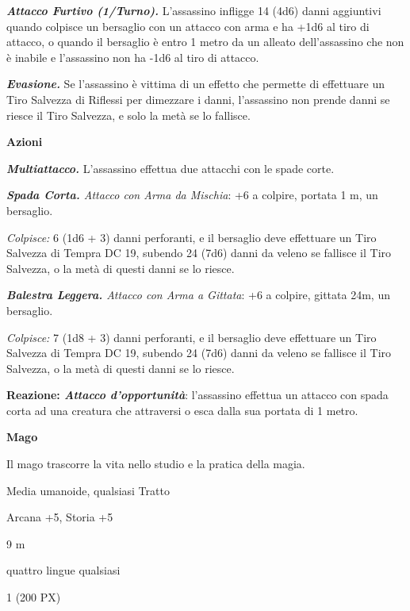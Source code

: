 \begin{multicols}{2}
{\emph{\textbf{Attacco Furtivo (1/Turno).}} L'assassino infligge 14 (4d6) danni aggiuntivi quando colpisce un bersaglio con un attacco con arma e ha +1d6 al tiro di attacco, o quando il bersaglio è entro 1 metro da un alleato dell'assassino che non è inabile e l'assassino non ha -1d6 al tiro di attacco.

\emph{\textbf{Evasione.}} Se l'assassino è vittima di un effetto che permette di effettuare un Tiro Salvezza di Riflessi per dimezzare i danni, l'assassino non prende danni se riesce il Tiro Salvezza, e solo la metà se lo fallisce.

\textbf{Azioni}

\emph{\textbf{Multiattacco.}} L'assassino effettua due attacchi con le spade corte.

\emph{\textbf{Spada Corta.} Attacco con Arma da Mischia}: +6 a colpire, portata 1 m, un bersaglio.

\emph{Colpisce:} 6 (1d6 + 3) danni perforanti, e il bersaglio deve effettuare un Tiro Salvezza di Tempra DC 19, subendo 24 (7d6) danni da veleno se fallisce il Tiro Salvezza, o la metà di questi danni se lo riesce.

\emph{\textbf{Balestra Leggera.} Attacco con Arma a Gittata}: +6 a colpire, gittata 24m, un bersaglio.

\emph{Colpisce:} 7 (1d8 + 3) danni perforanti, e il bersaglio deve effettuare un Tiro Salvezza di Tempra DC 19, subendo 24 (7d6) danni da veleno se fallisce il Tiro Salvezza, o la metà di questi danni se lo riesce.

\textbf{Reazione: \emph{Attacco d'opportunità}}: l'assassino effettua un attacco con spada corta ad una creatura che attraversi o esca dalla sua portata di 1 metro.

\medskip\textbf{Mago}

Il mago trascorre la vita nello studio e la pratica della magia.

\begin{description}[noitemsep, topsep=0pt, parsep=0pt, partopsep=0pt, itemsep=1pt, leftmargin=2.35cm,  labelwidth=2.2cm, itemindent=0cm, listparindent=0pt] %
\setlength{\baselineskip}{10pt}
\item[\textbf{Taglia/Tipo}] Media umanoide, qualsiasi Tratto
\item[\textbf{Caratt.}] 
\item[\textbf{Punti Ferita}] 
\item[\textbf{Comp.}] Arcana +5, Storia +5
\item[\textbf{Tiri Salvez.}] 
\item[\textbf{Movimento}] 9 m
\item[\textbf{Linguaggi}] quattro lingue qualsiasi
\item[\textbf{Sfida}] 1 (200 PX)
\end{description}
\smallskip

}
\end{multicols}
